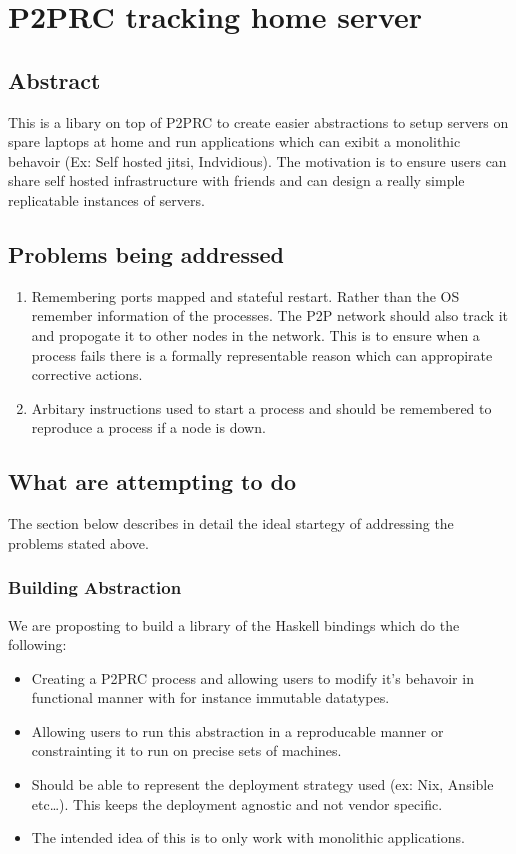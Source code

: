 \documentclass[11pt]{article}
\author{Akilan}
\date{\today}
\title{}
\begin{document}
\tableofcontents

\section{P2PRC tracking home server}
\label{sec:org64aa45e}
\subsection{Abstract}
\label{sec:org3d87056}
This is a libary on top of P2PRC to create easier abstractions
to setup servers on spare laptops at home and run applications
which can exibit a monolithic behavoir (Ex: Self hosted
jitsi, Indvidious). The motivation is to ensure users can
share self hosted infrastructure with friends and can design
a really simple replicatable instances of servers.

\subsection{Problems being addressed}
\label{sec:org553bb54}
\begin{enumerate}
\item Remembering ports mapped and stateful restart. Rather than the OS remember
information of the processes. The P2P network should also track it and
propogate it to other nodes in the network. This is to ensure when a process
fails there is a formally representable reason which can appropirate corrective
actions.
\item Arbitary instructions used to start a process and should be remembered to reproduce a
process if a node is down.
\end{enumerate}


\subsection{What are attempting to do}
\label{sec:org7867a81}
The section below describes in detail the ideal startegy of addressing the problems stated
above.

\subsubsection{Building Abstraction}
\label{sec:org4988e19}
We are proposting to build a library of the Haskell bindings which do the following:
\begin{itemize}
\item Creating a P2PRC process and allowing users to modify it's behavoir in functional manner with for instance
immutable datatypes.
\item Allowing users to run this abstraction in a reproducable manner or constrainting it to run on precise
sets of machines.
\item Should be able to represent the deployment strategy used (ex: Nix, Ansible etc\ldots{}). This keeps the
deployment agnostic and not vendor specific.
\item The intended idea of this is to only work with monolithic applications.
\end{itemize}
\end{document}
